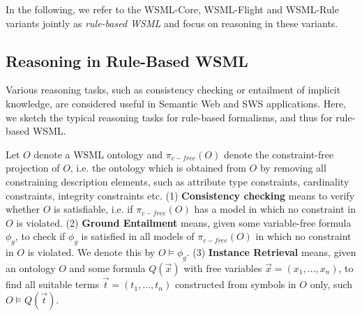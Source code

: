 In the following, we refer to the WSML-Core, WSML-Flight and
WSML-Rule variants jointly as \emph{rule-based WSML} and focus on
reasoning in these variants.

\subsection{Reasoning in Rule-Based WSML}
Various reasoning tasks, such as consistency checking or
entailment of implicit knowledge, are considered useful in
Semantic Web and SWS applications. Here, we sketch the typical
reasoning tasks for rule-based formalisms, and thus for rule-based
WSML.

Let $O$ denote a WSML ontology and $\pi_{c-free}(O)$ denote the
constraint-free projection of $O$, i.e. the ontology which is
obtained from $O$ by removing all constraining description
elements, such as attribute type constraints, cardinality
constraints, integrity constraints etc. (1) {\bf Consistency
checking} means to verify whether $O$ is satisfiable, i.e.
if $\pi_{c-free}(O)$ has a
model in which no constraint in $O$ is violated. (2) {\bf Ground Entailment} means, given some variable-free
formula $\phi_g$, to check if $\phi_g$ is satisfied in all models of $\pi_{c-free}(O)$
in which no constraint in $O$ is violated. We
denote this by $O \models \phi_g$. (3) {\bf Instance Retrieval}
means, given an ontology $O$ and some formula $Q(\vec{x})$ with
free variables $\vec{x} = (x_1,\ldots,x_n)$, to find all suitable
terms $\vec{t} = (t_1,\ldots,t_n)$ constructed from symbols in $O$
only, such $O \models Q(\vec{t})$.
